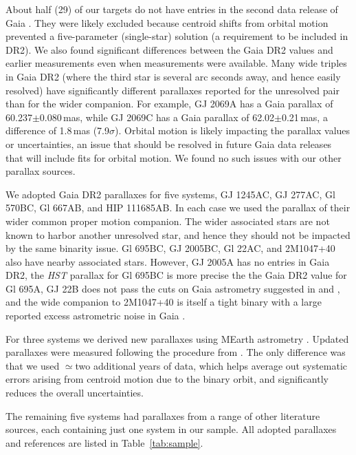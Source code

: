 \documentclass[twocolumn]{aastex62}
\begin{document}
About half (29) of our targets do not have entries in the second data release of Gaia \citep[DR2, ][]{GaiaDr2,Gaia-Collaboration:2018aa}. They were likely excluded because centroid shifts from orbital motion prevented a five-parameter (single-star) solution (a requirement to be included in DR2). We also found significant differences between the Gaia DR2 values and earlier measurements \citep[including from TGAS, ][]{2015A&A...574A.115M,gaiadr1} even when measurements were available. Many wide triples in Gaia DR2 (where the third star is several arc seconds away, and hence easily resolved) have significantly different parallaxes reported for the unresolved pair than for the wider companion. For example, GJ 2069A has a Gaia parallax of 60.237$\pm$0.080\,mas, while GJ 2069C has a Gaia parallax of 62.02$\pm$0.21\,mas, a difference of 1.8\,mas (7.9$\sigma$). Orbital motion is likely impacting the parallax values or uncertainties, an issue that should be resolved in future Gaia data releases that will include fits for orbital motion. We found no such issues with our other parallax sources.

We adopted Gaia DR2 parallaxes for five systems, GJ 1245AC, GJ 277AC, Gl 570BC, Gl 667AB, and HIP 111685AB. In each case we used the parallax of their wider common proper motion companion. The wider associated stars are not known to harbor another unresolved star, and hence they should not be impacted by the same binarity issue. Gl 695BC, GJ 2005BC, Gl 22AC, and 2M1047+40 also have nearby associated stars. However, GJ 2005A has no entries in Gaia DR2, the {\it HST} parallax for Gl 695BC is more precise the the Gaia DR2 value for Gl 695A, GJ 22B does not pass the cuts on Gaia astrometry suggested in \citet{GaiaDr2} and \citet{Dr2_HR}, and the wide companion to 2M1047+40 is itself a tight binary \citep[LP 213-67AB,][]{Dupuy2017} with a large reported excess astrometric noise in Gaia \citep[a sign of binarity, ][]{2018RNAAS...2...20E}.

For three systems we derived new parallaxes using MEarth astrometry \citep{Nutzman:2008gf}. Updated parallaxes were measured following the procedure from \citet{2014ApJ...784..156D}. The only difference was that we used $\simeq$two additional years of data, which helps average out systematic errors arising from centroid motion due to the binary orbit, and significantly reduces the overall uncertainties. 

The remaining five systems had parallaxes from a range of other literature sources, each containing just one system in our sample. All adopted parallaxes and references are listed in Table~\ref{tab:sample}.
\end{document}

